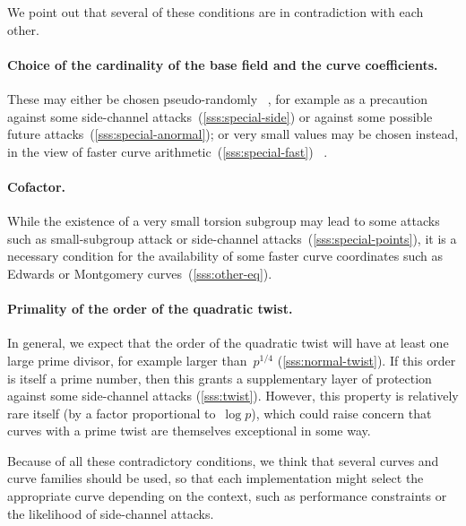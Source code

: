 \documentclass[twocolumn,letterpaper,10pt]{article}
\begin{document}
\bigbreak

We point out that several of these conditions are in contradiction
with each other.

\paragraph{Choice of the cardinality of the base field
and the curve coefficients.}
These may either be chosen pseudo-randomly~%
\cite{rfc5639,jorf2011ce}, for example
as a precaution against some side-channel attacks~(\ref{sss:special-side})
or against some possible future attacks~(\ref{sss:special-anormal});
or very small values may be chosen instead,
in the view of faster curve arithmetic~(\ref{sss:special-fast})~%
\cite{nist2000fips186-2,pkc2006bernstein,oscca2010sm2}.

\paragraph{Cofactor.}
While the existence of a very small torsion subgroup
may lead to some attacks such as
small-subgroup attack or side-channel attacks~(\ref{sss:special-points}),
it is a necessary condition for the availability
of some faster curve coordinates
such as Edwards or Montgomery curves~(\ref{sss:other-eq}).

\paragraph{Primality of the order of the quadratic twist.}
In general, we expect that the order of the quadratic twist
will have at least one large prime divisor,
for example larger than~$p^{1/4}$ (\ref{sss:normal-twist}).
If this order is itself a prime number,
then this grants a supplementary layer of protection
against some side-channel attacks (\ref{sss:twist}).
However, this property is relatively rare itself
(by a factor proportional to~$\log p$),
which could raise concern that
curves with a prime twist are themselves exceptional in some way.

\medskip

Because of all these contradictory conditions,
we think that several curves and curve families should be used,
so that each implementation might select the appropriate curve
depending on the context,
such as performance constraints or the likelihood of side-channel attacks.
\end{document}
